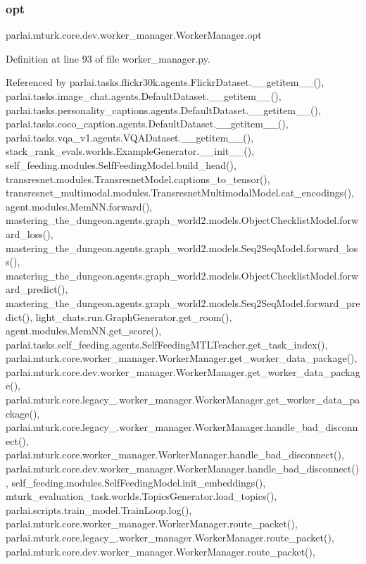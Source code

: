 \subsubsection{\texorpdfstring{opt}{opt}}
{\footnotesize\ttfamily parlai.\+mturk.\+core.\+dev.\+worker\+\_\+manager.\+Worker\+Manager.\+opt}



Definition at line 93 of file worker\+\_\+manager.\+py.



Referenced by parlai.\+tasks.\+flickr30k.\+agents.\+Flickr\+Dataset.\+\_\+\+\_\+getitem\+\_\+\+\_\+(), parlai.\+tasks.\+image\+\_\+chat.\+agents.\+Default\+Dataset.\+\_\+\+\_\+getitem\+\_\+\+\_\+(), parlai.\+tasks.\+personality\+\_\+captions.\+agents.\+Default\+Dataset.\+\_\+\+\_\+getitem\+\_\+\+\_\+(), parlai.\+tasks.\+coco\+\_\+caption.\+agents.\+Default\+Dataset.\+\_\+\+\_\+getitem\+\_\+\+\_\+(), parlai.\+tasks.\+vqa\+\_\+v1.\+agents.\+V\+Q\+A\+Dataset.\+\_\+\+\_\+getitem\+\_\+\+\_\+(), stack\+\_\+rank\+\_\+evals.\+worlds.\+Example\+Generator.\+\_\+\+\_\+init\+\_\+\+\_\+(), self\+\_\+feeding.\+modules.\+Self\+Feeding\+Model.\+build\+\_\+head(), transresnet.\+modules.\+Transresnet\+Model.\+captions\+\_\+to\+\_\+tensor(), transresnet\+\_\+multimodal.\+modules.\+Transresnet\+Multimodal\+Model.\+cat\+\_\+encodings(), agent.\+modules.\+Mem\+N\+N.\+forward(), mastering\+\_\+the\+\_\+dungeon.\+agents.\+graph\+\_\+world2.\+models.\+Object\+Checklist\+Model.\+forward\+\_\+loss(), mastering\+\_\+the\+\_\+dungeon.\+agents.\+graph\+\_\+world2.\+models.\+Seq2\+Seq\+Model.\+forward\+\_\+loss(), mastering\+\_\+the\+\_\+dungeon.\+agents.\+graph\+\_\+world2.\+models.\+Object\+Checklist\+Model.\+forward\+\_\+predict(), mastering\+\_\+the\+\_\+dungeon.\+agents.\+graph\+\_\+world2.\+models.\+Seq2\+Seq\+Model.\+forward\+\_\+predict(), light\+\_\+chats.\+run.\+Graph\+Generator.\+get\+\_\+room(), agent.\+modules.\+Mem\+N\+N.\+get\+\_\+score(), parlai.\+tasks.\+self\+\_\+feeding.\+agents.\+Self\+Feeding\+M\+T\+L\+Teacher.\+get\+\_\+task\+\_\+index(), parlai.\+mturk.\+core.\+worker\+\_\+manager.\+Worker\+Manager.\+get\+\_\+worker\+\_\+data\+\_\+package(), parlai.\+mturk.\+core.\+dev.\+worker\+\_\+manager.\+Worker\+Manager.\+get\+\_\+worker\+\_\+data\+\_\+package(), parlai.\+mturk.\+core.\+legacy\+\_.\+worker\+\_\+manager.\+Worker\+Manager.\+get\+\_\+worker\+\_\+data\+\_\+package(), parlai.\+mturk.\+core.\+legacy\+\_.\+worker\+\_\+manager.\+Worker\+Manager.\+handle\+\_\+bad\+\_\+disconnect(), parlai.\+mturk.\+core.\+worker\+\_\+manager.\+Worker\+Manager.\+handle\+\_\+bad\+\_\+disconnect(), parlai.\+mturk.\+core.\+dev.\+worker\+\_\+manager.\+Worker\+Manager.\+handle\+\_\+bad\+\_\+disconnect(), self\+\_\+feeding.\+modules.\+Self\+Feeding\+Model.\+init\+\_\+embeddings(), mturk\+\_\+evaluation\+\_\+task.\+worlds.\+Topics\+Generator.\+load\+\_\+topics(), parlai.\+scripts.\+train\+\_\+model.\+Train\+Loop.\+log(), parlai.\+mturk.\+core.\+worker\+\_\+manager.\+Worker\+Manager.\+route\+\_\+packet(), parlai.\+mturk.\+core.\+legacy\+\_.\+worker\+\_\+manager.\+Worker\+Manager.\+route\+\_\+packet(), parlai.\+mturk.\+core.\+dev.\+worker\+\_\+manager.\+Worker\+Manager.\+route\+\_\+packet(), 